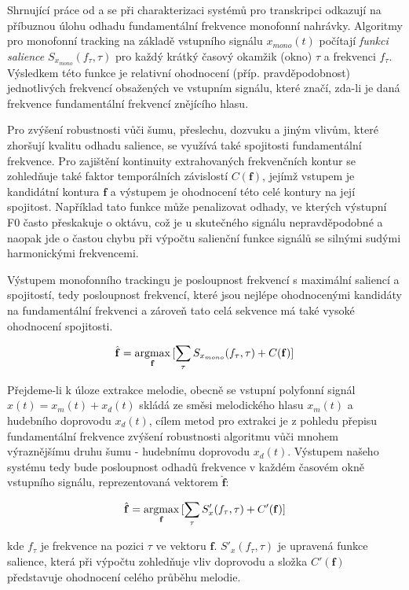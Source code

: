 Shrnující práce od \cite{Poliner2007} a \cite{Salamon2014} se při charakterizaci systémů pro transkripci odkazují na příbuznou úlohu odhadu fundamentální frekvence monofonní nahrávky. Algoritmy pro monofonní tracking na základě vstupního signálu $x_{mono}(t)$ počítají \emph{funkci salience} $S_{x_{mono}}(f_\tau, \tau)$ pro každý krátký časový okamžik (okno) $\tau$ a frekvenci $f_\tau$. Výsledkem této funkce je relativní ohodnocení (příp. pravděpodobnost) jednotlivých frekvencí obsažených ve vstupním signálu, které značí, zda-li je daná frekvence fundamentální frekvencí znějícího hlasu. 

Pro zvýšení robustnosti vůči šumu, přeslechu, dozvuku a jiným vlivům, které zhoršují kvalitu odhadu salience, se využívá také spojitosti fundamentální frekvence. Pro zajištění kontinuity extrahovaných frekvenčních kontur se zohledňuje také faktor temporálních závislostí $C(\mathbf{f})$, jejímž vstupem je kandidátní kontura $\mathbf{f}$ a výstupem je ohodnocení této celé kontury na její spojitost. Například tato funkce může penalizovat odhady, ve kterých výstupní F0 často přeskakuje o oktávu, což je u skutečného signálu nepravděpodobné a naopak jde o častou chybu při výpočtu salienční funkce signálů se silnými sudými harmonickými frekvencemi.

Výstupem monofonního trackingu je posloupnost frekvencí s maximální saliencí a spojitostí, tedy posloupnost frekvencí, které jsou nejlépe ohodnocenými kandidáty na fundamentální frekvenci a zároveň tato celá sekvence má také vysoké ohodnocení spojitosti.

    $$\hat{\mathbf{f}} = \argmax_{\mathbf{f}}{[\sum_{\tau}{S_{x_{mono}}(f_\tau, \tau)} + C(\mathbf{f})]}$$

Přejdeme-li k úloze extrakce melodie, obecně se vstupní polyfonní signál $x(t) = x_m(t) + x_d(t)$ skládá ze směsi melodického hlasu $x_m(t)$ a hudebního doprovodu $x_d(t)$, cílem metod pro extrakci je z pohledu přepisu fundamentální frekvence zvýšení robustnosti algoritmu vůči mnohem výraznějšímu druhu šumu - hudebnímu doprovodu $x_d(t)$. Výstupem našeho systému tedy bude posloupnost odhadů frekvence v každém časovém okně vstupního signálu, reprezentovaná vektorem $\hat{\mathbf{f}}$:

    $$\hat{\mathbf{f}} = \argmax_{\mathbf{f}}{[\sum_{\tau}{S'_x(f_\tau, \tau)} + C'(\mathbf{f})]}$$

kde $f_\tau$ je frekvence na pozici $\tau$ ve vektoru $\mathbf{f}$. $S'_x(f_\tau, \tau)$ je upravená funkce salience, která při výpočtu zohledňuje vliv doprovodu a složka $C'(\mathbf{f})$ představuje ohodnocení celého průběhu melodie.

